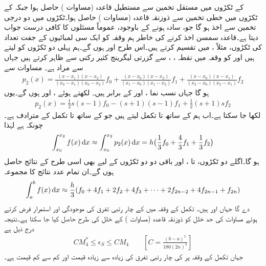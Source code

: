  کے  ٹکڑوں میں مستقل تخمین سے مستطیل قاعدہ (مساوات ) حاصل ہوا جبکہ  کے ٹکڑوں میں خطی تخمین سے ذوزنقہ قاعدہ (مساوات ) حاصل ہوا۔ٹکڑوں میں دو درجی تخمین سے  اخذ ہو گا جو، سادہ ہونے کے باوجود،  عموماً مسئلوں کا کافی درست جواب دیتا ہے۔قاعدہ سمسن  اخذ کرنے کی خاطر ہم وقفہ  کو ایک سی لمبائیوں کے  جفت تعداد کی  ٹکڑوں، مثلاً ، میں تقسیم کرتے ہیں۔اس طرح  اور   ہوں گے۔ہم پہلی دو ٹکڑوں  کو لیتے ہیں اور   کو وقفہ  میں نقطہ ، ،  سے گزرتی  لیگرینج کثیر رکنی  سے ظاہر کرتے ہیں جہاں  سے مراد  ہے۔ مساوات  سے
\begin{multline}\label{مساوات_اعدادی_لیگرینج_کثیر_رکنی_الف}
p_2(x)=\frac{(x-x_1)(x-x_2)}{(x_0-x_1)(x_0-x_2)}f_0+\frac{(x-x_0)(x-x_2)}{(x_1-x_0)(x_1-x_2)}f_1+\frac{(x-x_0)(x-x_1)}{(x_2-x_0)(x_2-x_1)}f_2
\end{multline}
ہو گا جہاں نسب نما ،  اور  کے برابر ہیں۔  لکھتے ہوئے  ،  اور  ہوں گے۔یوں 
\begin{align}
p_2(x)=\frac{1}{2}s(s-1)f_0-(s+1)(s-1)f_1+\frac{1}{2}(s+1)sf_2
\end{align}
لکھا جا سکتا ہے۔اب ہم  کے ساتھ  تا  تکمل لیتے ہیں جو  کے ساتھ  تا  تکمل کے مترادف ہے۔چونکہ  ہے لہٰذا
\begin{align*}
\int_{x_0}^{x_2}f(x)\dif x\approx \int_{x_0}^{x_2}p_2(x)\dif x=h\big(\frac{1}{3}f_0+\frac{4}{3}f_1+\frac{1}{3}f_2\big)
\end{align*}
ہو گا۔اگلے دو ٹکڑوں،  تا ، اور باقی دو دو ٹکڑوں  کے لیے بھی  اسی طرح کے نتائج حاصل ہوں گے۔ان تمام  عدد نتائج کا مجموعہ 
\begin{align}\label{مساوات_اعدادی_تکمل_سمسن_قاعدہ}
\int_a^b f(x)\dif x\approx \frac{h}{3}(f_0+4f_1+2f_2+4f_3+\cdots+2f_{2n-2}+4f_{2n-1}+f_{2n})
\end{align}
دے گا جہاں  اور  ہیں۔ تکمل کے وقفہ میں  کے چار رتبی تفرق کی موجودگی اور استمرار فرض کرتے ہوئے مساوات  کی حد خلل  کو ذوزنقہ قاعدہ (مساوات ) کے خلل کی طرح حاصل کیا جا سکتا ہے۔نتیجہ درج ذیل ہے
\begin{align}\label{مساوات_اعدادی_سمسن_حد_خلل}
CM_4^*\le \epsilon_S\le CM_4\quad \quad [C=\tfrac{(b-a)^5}{180(2n)^4}]
\end{align}
جہاں تکمل کے وقفہ پر  کی چار رتبی تفرق کی زیادہ سے زیادہ قیمت  اور کم سے کم قیمت  ہے۔

